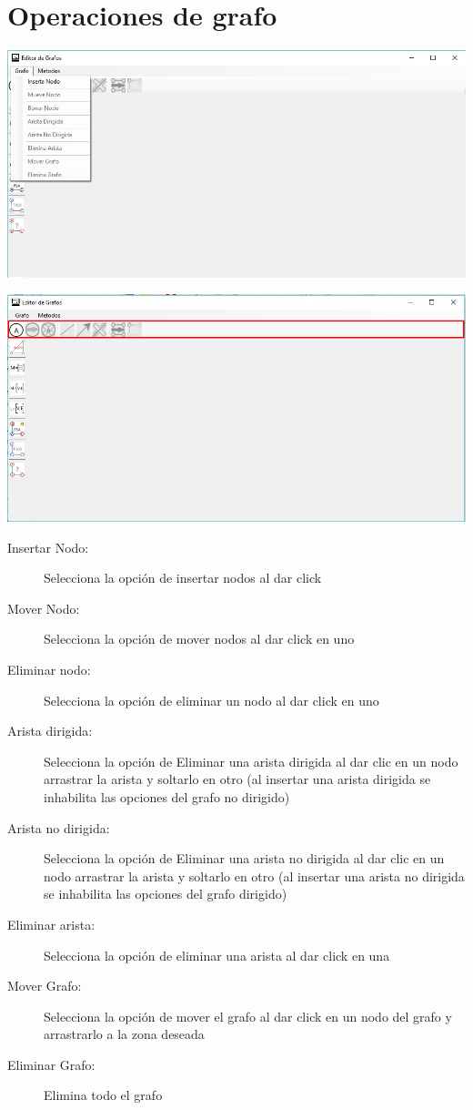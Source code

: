\documentclass[titlepage]{report}
\begin{document}
\chapter*{Operaciones de grafo}
\begin{center}
\includegraphics[scale=.60]{Imagen/2.jpg} 
\end{center}
\begin{center}
\includegraphics[scale=.60]{Imagen/3.jpg} 
\end{center}
\begin{description}
\item[Insertar Nodo:] Selecciona la opci\'{o}n de insertar nodos al dar click
\item[Mover Nodo:] Selecciona la opci\'{o}n de mover nodos al dar click en uno
\item[Eliminar nodo:] Selecciona la opci\'{o}n de eliminar un nodo al dar click en uno
\item[Arista dirigida:] Selecciona la opci\'{o}n de Eliminar una arista dirigida al dar clic en un nodo arrastrar la arista y soltarlo en otro (al insertar una arista dirigida se inhabilita las opciones del grafo no dirigido)
\item[Arista no dirigida:] Selecciona la opci\'{o}n de Eliminar una arista no dirigida al dar clic en un nodo arrastrar la arista y soltarlo en otro (al insertar una arista no dirigida se inhabilita las opciones del grafo dirigido)
\item[Eliminar arista:] Selecciona la opci\'{o}n de eliminar una arista al dar click en una
\item[Mover Grafo:] Selecciona la opci\'{o}n de mover el grafo al dar click en un nodo del grafo y arrastrarlo a la zona deseada
\item[Eliminar Grafo:] Elimina todo el grafo
\end{description}
\end{document}
